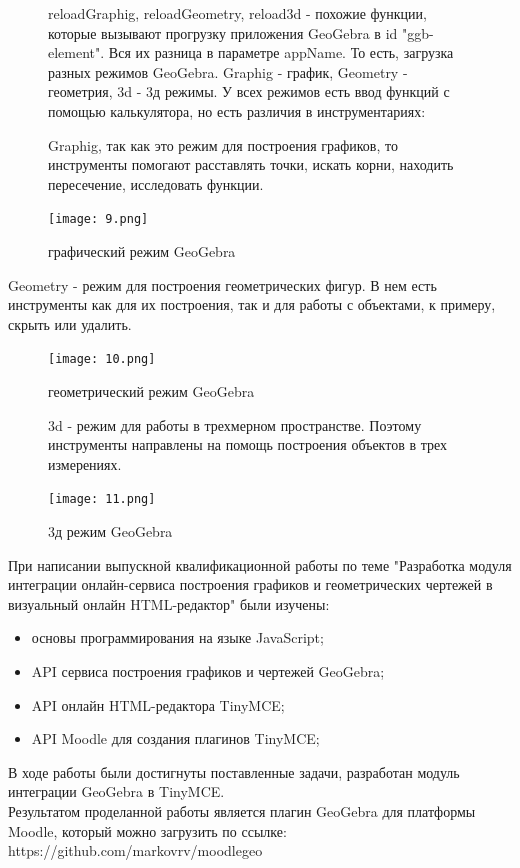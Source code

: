 \documentclass[14pt,Diplom]{diplomwork}
\begin{document}
\begin{itemize}

	\begin{figure}
		reloadGraphig, reloadGeometry, reload3d - похожие функции, которые вызывают прогрузку приложения GeoGebra в id "ggb-element". Вся их разница в параметре appName. То есть, загрузка разных режимов GeoGebra. Graphig - график, Geometry - геометрия, 3d - 3д режимы. У всех режимов есть ввод функций с помощью калькулятора, но есть различия в инструментариях:\\
			
			\item Graphig, так как это режим для построения графиков, то инструменты помогают расставлять точки, искать корни, находить пересечение, исследовать функции.
			\begin{center}
				\texttt{[image: 9.png]}\caption{графический режим GeoGebra}
			\end{center}
		\end{figure}
	
	
		\item Geometry - режим для построения геометрических фигур. В нем есть инструменты как для их построения, так и для работы с объектами, к примеру, скрыть или удалить.
		\begin{figure}
			\begin{center}
				\texttt{[image: 10.png]}\caption{геометрический режим GeoGebra}
			\end{center}
		\end{figure}


		\begin{figure} 
			\item 3d - режим для работы в трехмерном пространстве. Поэтому инструменты направлены на помощь построения объектов в трех измерениях.
			\begin{center}
				\texttt{[image: 11.png]}\caption{3д режим GeoGebra}
			\end{center}
		\end{figure}
\end{itemize}



	  



При написании выпускной квалификационной работы по теме "Разработка модуля интеграции онлайн-сервиса построения графиков и геометрических чертежей в визуальный онлайн HTML-редактор" были изучены:
\begin{itemize}
	\item основы программирования на языке JavaScript;
	\item API сервиса построения графиков и чертежей GeoGebra;
	\item API онлайн HTML-редактора TinyMCE;
	\item API Moodle для создания плагинов TinyMCE;
\end{itemize}
В ходе работы были достигнуты поставленные задачи, разработан модуль интеграции GeoGebra в TinyMCE.\\
Результатом проделанной работы является плагин GeoGebra для платформы Moodle, который можно загрузить по ссылке: https://github.com/markovrv/moodlegeo
\end{document}
